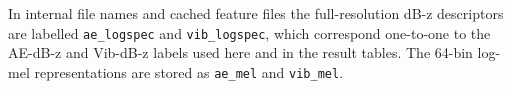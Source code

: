 In internal file names and cached feature files the full-resolution
dB-z descriptors are labelled \texttt{ae\_logspec} and
\texttt{vib\_logspec}, which correspond one-to-one to the AE-dB-z and
Vib-dB-z labels used here and in the result tables. The 64-bin log-mel
representations are stored as \texttt{ae\_mel} and \texttt{vib\_mel}.
